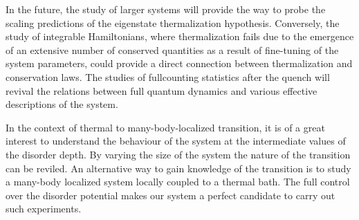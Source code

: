In the future, the study of larger systems will provide the way to probe the scaling predictions of the eigenstate thermalization hypothesis. Conversely, the study of integrable Hamiltonians, where thermalization fails due to the emergence of an extensive number of conserved quantities as a result of fine-tuning of the system parameters, could provide a direct connection between thermalization and conservation laws. The studies of fullcounting statistics after the quench will revival the relations between full quantum dynamics and various effective descriptions of the system.

In the context of thermal to many-body-localized transition, it is of a great interest to understand the behaviour of the system at the intermediate values of the disorder depth. By varying the size of the system the nature of the transition can be reviled. An alternative way to gain knowledge of the transition is to study a many-body localized system locally coupled to a thermal bath. The full control over the disorder potential makes our system a perfect candidate to carry out such experiments.